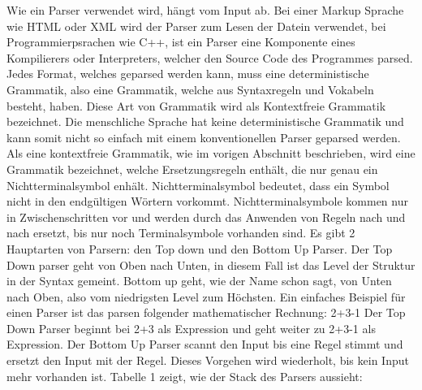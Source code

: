 Wie ein Parser verwendet wird, hängt vom Input ab. Bei einer Markup Sprache wie HTML oder XML wird der Parser zum Lesen der Datein verwendet, bei Programmierpsrachen wie C++, ist ein Parser eine Komponente eines Kompilierers oder Interpreters, welcher den Source Code des Programmes parsed.\newline\newline
Jedes Format, welches geparsed werden kann, muss eine deterministische Grammatik, also eine Grammatik, welche aus Syntaxregeln und Vokabeln besteht, haben. Diese Art von Grammatik wird als \glqq{} Kontextfreie Grammatik \grqq{} bezeichnet. Die menschliche Sprache hat keine deterministische Grammatik und kann somit nicht so einfach mit einem konventionellen Parser geparsed werden. \autocite[]{Garsiel.}\newline\newline
Als eine kontextfreie Grammatik, wie im vorigen Abschnitt beschrieben, wird eine Grammatik bezeichnet, welche Ersetzungsregeln enthält, die nur genau ein Nichtterminalsymbol enhält. Nichtterminalsymbol bedeutet, dass ein Symbol nicht in den endgültigen Wörtern vorkommt. Nichtterminalsymbole kommen nur in Zwischenschritten vor und werden durch das Anwenden von Regeln nach und nach ersetzt, bis nur noch Terminalsymbole vorhanden sind.\newline\newline
Es gibt 2 Hauptarten von Parsern: den \glqq{}Top down \grqq{} und den \glqq{} Bottom Up \grqq{} Parser. Der Top Down parser geht von Oben nach Unten, in diesem Fall ist das Level der Struktur in der Syntax gemeint. Bottom up geht, wie der Name schon sagt, von Unten nach Oben, also vom niedrigsten Level zum Höchsten. \newline
Ein einfaches Beispiel für einen Parser ist das parsen folgender mathematischer Rechnung:
2+3-1\newline
Der Top Down Parser beginnt bei 2+3 als Expression und geht weiter zu 2+3-1 als Expression. \newline
Der Bottom Up Parser scannt den Input bis eine Regel stimmt und ersetzt den Input mit der Regel. Dieses Vorgehen wird wiederholt, bis kein Input mehr vorhanden ist. Tabelle 1 zeigt, wie der Stack des Parsers aussieht:
